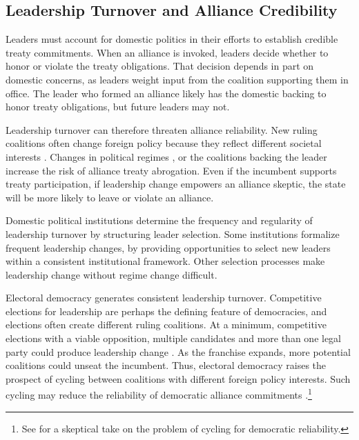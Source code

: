 \documentclass[12pt]{article}
\begin{document}
\subsection{Leadership Turnover and Alliance Credibility}


Leaders must account for domestic politics in their efforts to establish credible treaty commitments.
When an alliance is invoked, leaders decide whether to honor or violate the treaty obligations. 
That decision depends in part on domestic concerns, as leaders weight input from the coalition supporting them in office. 
The leader who formed an alliance likely has the domestic backing to honor treaty obligations, but future leaders may not. 


Leadership turnover can therefore threaten alliance reliability.
New ruling coalitions often change foreign policy because they reflect different societal interests \citep{Lobell2004, Narizny2007, Mattesetal2016}.  
Changes in political regimes \citep{LeedsSavun2007}, or the coalitions backing the leader \citep{Leedsetal2009} increase the risk of alliance treaty abrogation. 
Even if the incumbent supports treaty participation, if leadership change empowers an alliance skeptic, the state will be more likely to leave or violate an alliance.  


Domestic political institutions determine the frequency and regularity of leadership turnover by structuring leader selection. 
Some institutions formalize frequent leadership changes, by providing opportunities to select new leaders within a consistent institutional framework. 
Other selection processes make leadership change without regime change difficult. 


Electoral democracy generates consistent leadership turnover. 
Competitive elections for leadership are perhaps the defining feature of democracies, and elections often create different ruling coalitions. 
At a minimum, competitive elections with a viable opposition, multiple candidates and more than one legal party could produce leadership change \citep{HydeMarinov2012}. 
As the franchise expands, more potential coalitions could unseat the incumbent.  
Thus, electoral democracy raises the prospect of cycling between coalitions with different foreign policy interests. 
Such cycling may reduce the reliability of democratic alliance commitments \citep{GartzkeGleditsch2004}.\footnote{See \citet{Gaubatz1996} for a skeptical take on the problem of cycling for democratic reliability.}
\end{document}
